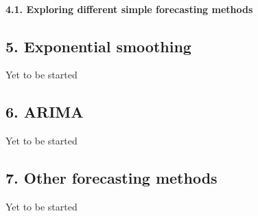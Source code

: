 \documentclass[
]{article}
\begin{document}
\hypertarget{exploring-different-simple-forecasting-methods}{%
\paragraph{4.1. Exploring different simple forecasting
methods}\label{exploring-different-simple-forecasting-methods}}

\hypertarget{exponential-smoothing}{%
\subsection{5. Exponential smoothing}\label{exponential-smoothing}}

Yet to be started

\hypertarget{arima}{%
\subsection{6. ARIMA}\label{arima}}

Yet to be started

\hypertarget{other-forecasting-methods}{%
\subsection{7. Other forecasting
methods}\label{other-forecasting-methods}}

Yet to be started
\end{document}
